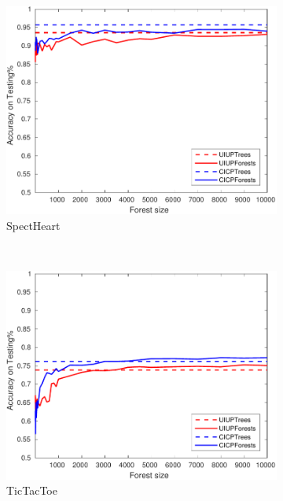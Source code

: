 \begin{figure}[ht]
\begin{subfigure}[b]{0.3\textwidth}
  	\includegraphics[width=\textwidth]{figs/PLPTF/Forests/SpectHeartDownsampledFurther_Forests_MH.pdf}
  	\caption{SpectHeart}
		\label{fig:S4}
	\end{subfigure}
  \\
  \begin{subfigure}[b]{0.3\textwidth}
		\centering
  	\includegraphics[width=\textwidth]{figs/PLPTF/Forests/TicTacToe_Forests_MH.pdf}
  	\caption{TicTacToe}
		\label{fig:T4}
	\end{subfigure}
  \begin{subfigure}[b]{0.3\textwidth}
		\centering

\end{subfigure}
\end{figure}

